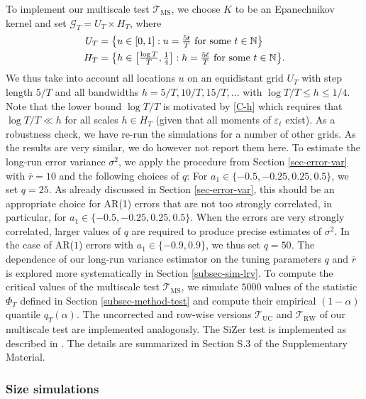 To implement our multiscale test $\mathcal{T}_{\text{MS}}$, we choose $K$ to be an Epanechnikov kernel and set $\mathcal{G}_T = U_T \times H_T$, where 
\begin{align*}
U_T & = \big\{ u \in [0,1]: u = \textstyle{\frac{5t}{T}} \text{ for some } t \in \mathbb{N} \big\} \\
H_T & = \big\{ h \in \big[ \textstyle{\frac{\log T}{T}}, \textstyle{\frac{1}{4}} \big]:  h = \textstyle{\frac{5\ell}{T}} \text{ for some } t \in \mathbb{N} \big\}. 
\end{align*}
We thus take into account all locations $u$ on an equidistant grid $U_T$ with step length $5/T$ and all bandwidths $h=5/T, 10/T, 15/T,\ldots$ with $\log T /T \le h \le 1/4$. Note that the lower bound $\log T / T$ is motivated by \ref{C-h} which requires that $\log T /T \ll h$ for all scales $h \in H_T$ (given that all moments of $\varepsilon_t$ exist). As a robustness check, we have re-run the simulations for a number of other grids. As the results are very similar, we do however not report them here. 
To estimate the long-run error variance $\sigma^2$, we apply the procedure from Section \ref{sec-error-var} with $\overline{r}=10$ and the following choices of $q$: For $a_1 \in \{-0.5,-0.25,0.25,0.5\}$, we set $q = 25$. As already discussed in Section \ref{sec-error-var}, this should be an appropriate choice for AR(1) errors that are not too strongly correlated, in particular, for $a_1 \in \{-0.5,-0.25,0.25,0.5\}$. When the errors are very strongly correlated, larger values of $q$ are required to produce precise estimates of $\sigma^2$. In the case of AR($1$) errors with $a_1 \in \{-0.9,0.9\}$, we thus set $q = 50$. The dependence of our long-run variance estimator on the tuning parameters $q$ and $\overline{r}$ is explored more systematically in Section \ref{subsec-sim-lrv}. 
To compute the critical values of the multiscale test $\mathcal{T}_{\text{MS}}$, we simulate $5000$ values of the statistic $\Phi_T$ defined in Section \ref{subsec-method-test} and compute their empirical $(1-\alpha)$ quantile $q_T(\alpha)$. The uncorrected and row-wise versions $\mathcal{T}_{\text{UC}}$ and $\mathcal{T}_{\text{RW}}$ of our multiscale test are implemented analogously. The SiZer test is implemented as described in \cite{ParkHannigKang2009}. The details are summarized in Section S.3 of the Supplementary Material. 


\subsubsection{Size simulations} 


